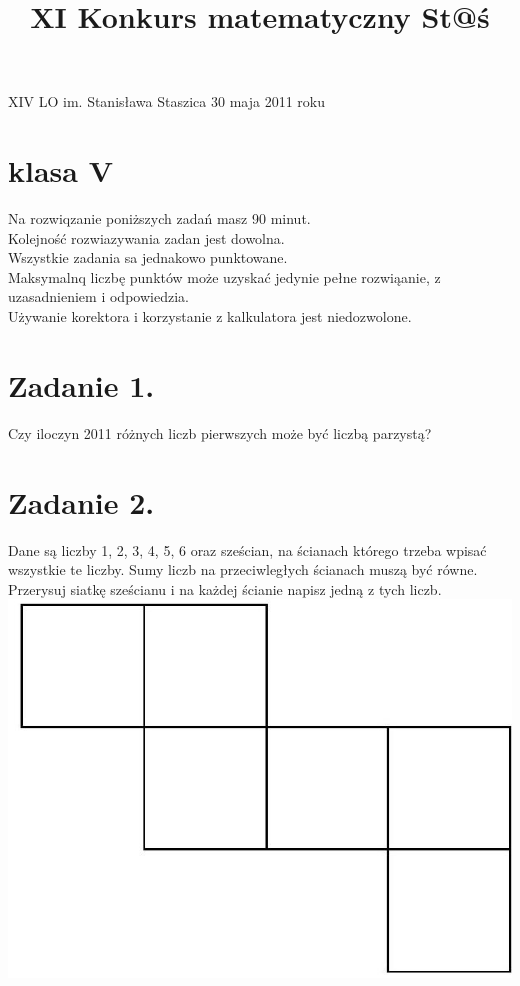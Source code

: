 \documentclass[10pt]{article}
\title{XI Konkurs matematyczny St@ś }
\author{}
\date{}
\begin{document}
\maketitle
XIV LO im. Stanisława Staszica 30 maja 2011 roku

\section*{klasa V}
Na rozwiqzanie poniższych zadań masz 90 minut.\\
Kolejność rozwiazywania zadan jest dowolna.\\
Wszystkie zadania sa jednakowo punktowane.\\
Maksymalnq liczbę punktów może uzyskać jedynie pełne rozwiąanie, z uzasadnieniem i odpowiedzia.\\
Używanie korektora i korzystanie z kalkulatora jest niedozwolone.

\section*{Zadanie 1.}
Czy iloczyn 2011 różnych liczb pierwszych może być liczbą parzystą?

\section*{Zadanie 2.}
Dane są liczby 1, 2, 3, 4, 5, 6 oraz sześcian, na ścianach którego trzeba wpisać wszystkie te liczby. Sumy liczb na przeciwległych ścianach muszą być równe.\\
Przerysuj siatkę sześcianu i na każdej ścianie napisz jedną z tych liczb.\\
\includegraphics[max width=\textwidth, center]{2024_11_21_1d3b8ece52cfa609efbfg-1(1)}
\end{document}
